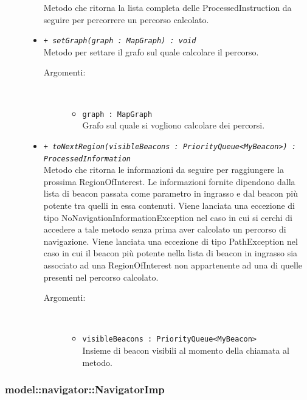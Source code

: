 \documentclass[../DefinizioneDiProdotto.tex]{subfiles}
\begin{document}
\begin{description}
\begin{itemize}
Metodo che ritorna la lista completa delle ProcessedInstruction da seguire per percorrere un percorso calcolato.
 \item \texttt{+ \textit{setGraph(graph : MapGraph) : void}}\\
Metodo per settare il grafo sul quale calcolare il percorso.
 \begin{description}
\item[Argomenti:] \
\begin{itemize}
\item \texttt{graph : MapGraph}\\
Grafo sul quale si vogliono calcolare dei percorsi.\end{itemize}
\end{description}
\item \texttt{+ \textit{toNextRegion(visibleBeacons : PriorityQueue<MyBeacon>) : ProcessedInformation}}\\
Metodo che ritorna le informazioni da seguire per raggiungere la prossima RegionOfInterest. Le informazioni fornite dipendono dalla lista di beacon passata come parametro in ingrasso e dal beacon più potente tra quelli in essa contenuti. 
Viene lanciata una eccezione di tipo NoNavigationInformationException nel caso in cui si cerchi di accedere a tale metodo senza prima aver calcolato un percorso di navigazione.
Viene lanciata una eccezione di tipo PathException nel caso in cui il beacon più potente nella lista di beacon in ingrasso sia associato ad una RegionOfInterest non appartenente ad una di quelle presenti nel percorso calcolato.
 \begin{description}
\item[Argomenti:] \
\begin{itemize}
\item \texttt{visibleBeacons : PriorityQueue<MyBeacon>}\\
Insieme di beacon visibili al momento della chiamata al metodo.\end{itemize}
\end{description}
\end{itemize}
\end{description}

\subsubsection{model::navigator::NavigatorImp}
\end{document}
